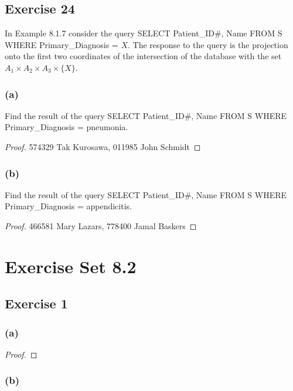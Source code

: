 \documentclass[14pt]{extarticle}
\begin{document}
\subsection{Exercise 24}
In Example 8.1.7 consider the query SELECT Patient\_ID\#, Name FROM S WHERE Primary\_Diagnosis = $X$. The response to 
the query is the projection onto the first two coordinates of the intersection of the database with the set 
\(A_1 \times A_2 \times A_3 \times \{X\}\).

\subsubsection{(a)}
Find the result of the query SELECT Patient\_ID\#, Name FROM S WHERE Primary\_Diagnosis = pneumonia.

\begin{proof}
574329 Tak Kurosawa, 011985 John Schmidt
\end{proof}

\subsubsection{(b)}
Find the result of the query SELECT Patient\_ID\#, Name FROM S WHERE Primary\_Diagnosis = appendicitis.

\begin{proof}
466581 Mary Lazars, 778400 Jamal Baskers
\end{proof}

\section{Exercise Set 8.2}

\subsection{Exercise 1}

\subsubsection{(a)}

\begin{proof}

\end{proof}

\subsubsection{(b)}
\end{document}
